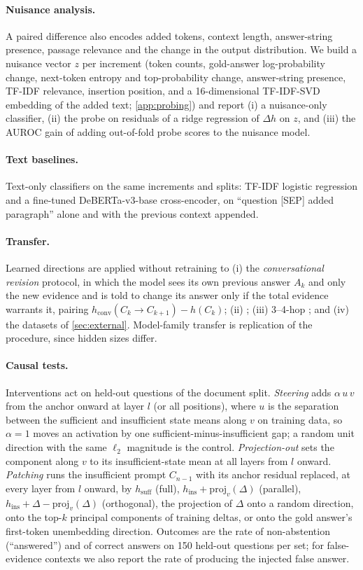 \paragraph{Nuisance analysis.}
A paired difference also encodes added tokens, context length, answer-string presence, passage relevance and the change in the output distribution. We build a nuisance vector $z$ per increment (token counts, gold-answer log-probability change, next-token entropy and top-probability change, answer-string presence, TF-IDF relevance, insertion position, and a 16-dimensional TF-IDF-SVD embedding of the added text; \cref{app:probing}) and report (i) a nuisance-only classifier, (ii) the probe on residuals of a ridge regression of $\Delta h$ on $z$, and (iii) the AUROC gain of adding out-of-fold probe scores to the nuisance model.

\paragraph{Text baselines.}
Text-only classifiers on the same increments and splits: TF-IDF logistic regression and a fine-tuned DeBERTa-v3-base cross-encoder, on ``question [SEP] added paragraph'' alone and with the previous context appended.

\paragraph{Transfer.}
Learned directions are applied without retraining to (i) the \emph{conversational revision} protocol, in which the model sees its own previous answer $A_k$ and only the new evidence and is told to change its answer only if the total evidence warrants it, pairing $h_{\text{conv}}(C_k\to C_{k+1})-h(C_k)$; (ii) \twowiki{}; (iii) 3--4-hop \musique{}; and (iv) the datasets of \cref{sec:external}. Model-family transfer is replication of the procedure, since hidden sizes differ.

\paragraph{Causal tests.}
Interventions act on held-out questions of the document split. \emph{Steering} adds $\alpha\,u\,v$ from the anchor onward at layer $l$ (or all positions), where $u$ is the separation between the sufficient and insufficient state means along $v$ on training data, so $\alpha=1$ moves an activation by one sufficient-minus-insufficient gap; a random unit direction with the same $\ell_2$ magnitude is the control. \emph{Projection-out} sets the component along $v$ to its insufficient-state mean at all layers from $l$ onward. \emph{Patching} runs the insufficient prompt $C_{n-1}$ with its anchor residual replaced, at every layer from $l$ onward, by $h_{\text{suff}}$ (full), $h_{\text{ins}}+\mathrm{proj}_v(\Delta)$ (parallel), $h_{\text{ins}}+\Delta-\mathrm{proj}_v(\Delta)$ (orthogonal), the projection of $\Delta$ onto a random direction, onto the top-$k$ principal components of training deltas, or onto the gold answer's first-token unembedding direction. Outcomes are the rate of non-abstention (``answered'') and of correct answers on 150 held-out questions per set; for false-evidence contexts we also report the rate of producing the injected false answer.
